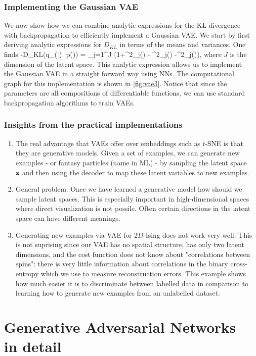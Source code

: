 \subsubsection{Implementing the Gaussian VAE}
We now show how we can combine analytic expressions for the KL-divergence with backpropagation to efficiently implement a Gaussian VAE. We start by first deriving analytic expressions for $D_{KL}$ in terms of the means and variances. One finds
\be 
\label{eq:vaeKLgaussian}
-D_{KL}(q_\phi(\mz |\mx) |p(\mz)) = \half \sum_{j=1}^J (1+\log \sigma^2_j(\mx) - \mu^2_j(\mx) -\sigma^2_j(\mx)),
\ee 
where $J$ is the dimension of the latent space.
This analytic expression allows us to implement the Gaussian VAE in a straight forward way using NNs. The computational graph for this implementation is shown in \ref{fig:vae3}. Notice that since the parameters are all compositions of differentiable functions, we can use standard backpropagation algorithms to train VAEs.

\subsubsection{Insights from the practical implementations}
\begin{enumerate}
\item The real advantage that VAEs offer over embeddings such as $t$-SNE is that they are generative models. Given a set of examples, we can generate new examples - or fantasy particles (name in ML) - by sampling the latent space $\mathbf{z}$ and then using the decoder to map these latent variables to new examples.\\
\item General problem: Once we have learned a generative model how should we sample latent spaces. This is especially important in high-dimensional spaces where direct visualization is not possile. Often certain directions in the latent space can have different meanings.
\item Generating new examples via VAE for $2D$ Ising does not work very well. This is not suprising since our VAE has no spatial structure, has only two latent dimensions, and the cost function does not know about "correlations between spins": there is very little information about correlations in the binary cross-entropy which we use to measure reconstruction errors. This example shows how much easier it is to discriminate between labelled data in comparison to learning how to generate new examples from an unlabelled dataset. 
\end{enumerate}

\section{Generative Adversarial Networks in detail}
\label{sec:gan}


























 